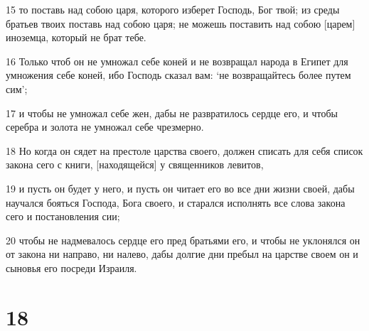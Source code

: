 \par 15 то поставь над собою царя, которого изберет Господь, Бог твой; из среды братьев твоих поставь над собою царя; не можешь поставить над собою [царем] иноземца, который не брат тебе.
\par 16 Только чтоб он не умножал себе коней и не возвращал народа в Египет для умножения себе коней, ибо Господь сказал вам: `не возвращайтесь более путем сим';
\par 17 и чтобы не умножал себе жен, дабы не развратилось сердце его, и чтобы серебра и золота не умножал себе чрезмерно.
\par 18 Но когда он сядет на престоле царства своего, должен списать для себя список закона сего с книги, [находящейся] у священников левитов,
\par 19 и пусть он будет у него, и пусть он читает его во все дни жизни своей, дабы научался бояться Господа, Бога своего, и старался исполнять все слова закона сего и постановления сии;
\par 20 чтобы не надмевалось сердце его пред братьями его, и чтобы не уклонялся он от закона ни направо, ни налево, дабы долгие дни пребыл на царстве своем он и сыновья его посреди Израиля.

\chapter{18}

